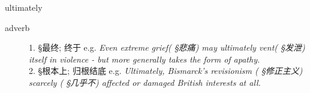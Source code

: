 \documentclass[avery5372, grid]{flashcards}
\begin{document}
\begin{flashcard}[{\B  7 Habits} {\S 词汇}]{\Huge ultimately}
\begin{description}
			
			
			
			
		\item[adverb] 
						
			1. {\S 最终; 终于} e.g. \textit{Even extreme grief\textnormal{( {\S 悲痛})} may ultimately vent\textnormal{( {\S 发泄})} itself in violence - but more generally takes the form of apathy.}\\
			
			2. {\S 根本上; 归根结底} e.g. \textit{Ultimately, Bismarck's revisionism \textnormal{( {\S 修正主义})} scarcely \textnormal{( {\S 几乎不})} affected or damaged British interests at all.}\\
			
			
	\end{description}
\end{flashcard}
\end{document}
